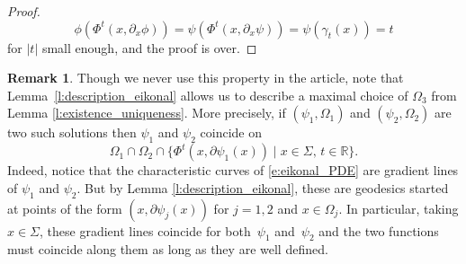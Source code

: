 \documentclass[JEP,XML,SOM,Unicode,published]{cedram}
\let\sep\mid
\theoremstyle{plain}
\theoremstyle{definition}
\newtheorem{remark}[theorem]{Remark}
\newcommand{\R}{\mathbb{R}}
\begin{document}
\begin{appendix}
\begin{proof}
\[
\phi(\Phi^t(x,\partial_x\phi))=\psi(\Phi^t(x,\partial_x\psi))=\psi(\gamma_t(x))=t
\]
for $|t|$ small enough, and the proof is over.
\end{proof}
\begin{remark}
Though we never use this property in the article, note that Lem\-ma~\ref{l:description_eikonal} allows us to describe a maximal choice of $\Omega_3$ from Lemma \ref{l:existence_uniqueness}. More precisely, if $(\psi_1,\Omega_1)$ and $(\psi_2,\Omega_2)$ are two such solutions then $\psi_1$ and $\psi_2$ coincide on
\[
\Omega_1\cap \Omega_2\cap\{\Phi^t(x,\partial\psi_1(x))\sep x\in\Sigma,\, t\in\R\}.
\]
Indeed, notice that the characteristic curves of \eqref{e:eikonal_PDE} are gradient lines of $\psi_1$ and $\psi_2$. But by Lemma \ref{l:description_eikonal}, these are geodesics started at points of the form $(x,\partial\psi_j(x))$ for $j=1,2$ and $x\in\Omega_j$. In particular, taking $x\in\Sigma$, these gradient lines coincide for both~$\psi_1$ and~$\psi_2$ and the two functions must coincide along them as long as they are well defined.
\end{remark}
\end{appendix}

\backmatter


\end{document}
